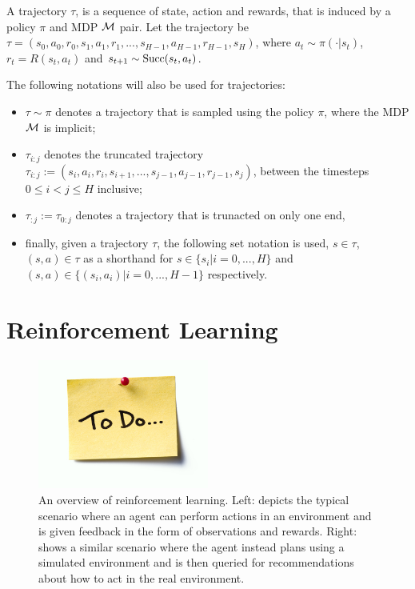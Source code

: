    \begin{defn}
        \label{def:trajectory}
        A \textnormal{trajectory} $\tau$, is a sequence of state, action and rewards, that is induced by a policy $\pi$ and MDP $\mathcal{M}$ pair. Let the trajectory be $\tau = (s_0, a_0, r_0, s_1, a_1, r_1, ..., s_{H-1}, a_{H-1}, r_{H-1}, s_H)$, where $a_t \sim \pi(\cdot|s_t)$, $r_t=R(s_t,a_t)$ and $s_{t+1} \sim {\textnormal{Succ}(s_t,a_t)}$. 
        
        The following notations will also be used for trajectories:
        \begin{itemize}
            \item $\tau\sim\pi$ denotes a trajectory that is sampled using the policy $\pi$, where the MDP $\mathcal{M}$ is implicit;
            \item $\tau_{i:j}$ denotes the \textnormal{truncated trajectory} $\tau_{i:j}:=(s_i, a_i, r_i, s_{i+1}, ..., s_{j-1}, a_{j-1}, r_{j-1}, s_j)$, between the timesteps $0\leq i < j \leq H$ inclusive;
            \item $\tau_{:j}:=\tau_{0:j}$ denotes a trajectory that is trunacted on only one end,
            \item finally, given a trajectory $\tau$, the following set notation is used, $s\in \tau$, $(s,a)\in\tau$ as a shorthand for $s\in\{s_i|i=0,...,H\}$ and $(s,a)\in\{(s_i,a_i)|i=0,...,H-1\}$ respectively. 
        \end{itemize}
    \end{defn}








\section{Reinforcement Learning}
\label{sec:2-2-rl}

    \begin{figure}
        \centering\includegraphics[width=0.5\textwidth]{figures/todo.jpg} 
        \caption[An overview of reinforcement learning.]{An overview of reinforcement learning. Left: depicts the typical scenario where an agent can perform actions in an environment and is given feedback in the form of observations and rewards. Right: shows a similar scenario where the agent instead plans using a simulated environment and is then queried for recommendations about how to act in the real environment.}
        \label{fig:rl_overview}
    \end{figure}

